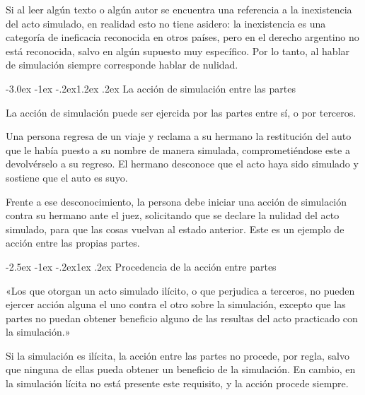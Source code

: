 \documentclass[12pt,oneside]{book}
\makeatletter
\renewcommand\section{\@startsection{section}{1}{\z@}%
  {-3.0ex \@plus -1ex \@minus -.2ex}{1.2ex \@plus .2ex}%
  {\normalfont\large\bfseries\color{acento}}}
\renewcommand\subsection{\@startsection{subsection}{2}{\z@}%
  {-2.5ex \@plus -1ex \@minus -.2ex}{1ex \@plus .2ex}%
  {\normalfont\normalsize\bfseries}}
\makeatother
\begin{document}
\begin{importante}
Si al leer algún texto o algún autor se encuentra una referencia a la inexistencia del acto simulado, en realidad esto no tiene asidero: la inexistencia es una categoría de ineficacia reconocida en otros países, pero en el derecho argentino no está reconocida, salvo en algún supuesto muy específico. Por lo tanto, al hablar de simulación siempre corresponde hablar de nulidad.
\end{importante}

\section{La acción de simulación entre las partes}

La acción de simulación puede ser ejercida por las partes entre sí, o por terceros.

\begin{ejemplo}
Una persona regresa de un viaje y reclama a su hermano la restitución del auto que le había puesto a su nombre de manera simulada, comprometiéndose este a devolvérselo a su regreso. El hermano desconoce que el acto haya sido simulado y sostiene que el auto es suyo.

Frente a ese desconocimiento, la persona debe iniciar una acción de simulación contra su hermano ante el juez, solicitando que se declare la nulidad del acto simulado, para que las cosas vuelvan al estado anterior. Este es un ejemplo de acción entre las propias partes.
\end{ejemplo}

\subsection{Procedencia de la acción entre partes}

\begin{regla}
«Los que otorgan un acto simulado ilícito, o que perjudica a terceros, no pueden ejercer acción alguna el uno contra el otro sobre la simulación, excepto que las partes no puedan obtener beneficio alguno de las resultas del acto practicado con la simulación.»
\end{regla}

Si la simulación es ilícita, la acción entre las partes no procede, por regla, salvo que ninguna de ellas pueda obtener un beneficio de la simulación. En cambio, en la simulación lícita no está presente este requisito, y la acción procede siempre.
\end{document}
